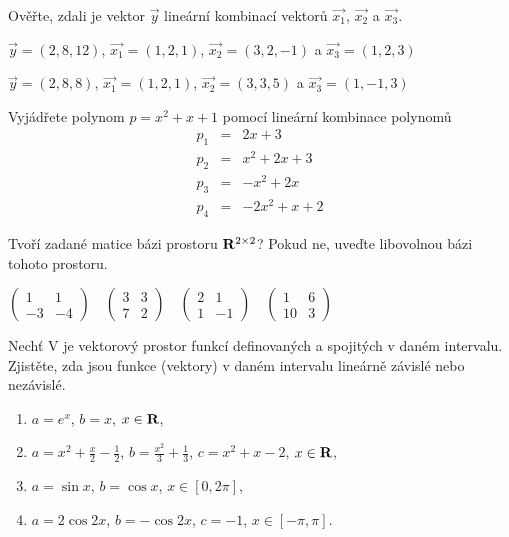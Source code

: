 \documentclass[a4paper,10pt]{book}
\def\Real{{\rm\bf R}}
\begin{document}
\exercise \label{ex:lkb2} Ověřte, zdali je vektor $\vec{y}$ lineární kombinací vektorů $\vec{x_1}$, $\vec{x_2}$ a $\vec{x_3}$.

  \begin{enumerate*} 
    \item $\vec{y}=(2,8,12)$, $\vec{x_1}=(1,2,1)$, $\vec{x_2}=(3,2,-1)$ a $\vec{x_3}=(1,2,3)$  \\
    \item $\vec{y}=(2,8,8)$, $\vec{x_1}=(1,2,1)$, $\vec{x_2}=(3,3,5)$ a $\vec{x_3}=(1,-1,3)$  \\
  \end{enumerate*}
  
\exercise \label{ex:lkb3} Vyjádřete polynom $p = x^2+x+1$ pomocí lineární kombinace polynomů
  \begin{eqnarray*}
    p_1 &=& 2x + 3 \\
    p_2 &=& x^2+2x+3 \\
    p_3 &=& -x^2+2x \\
    p_4 &=& -2x^2+x+2
  \end{eqnarray*}

\exercise \label{ex:lkb4} Tvoří zadané matice bázi prostoru $\Real^{2\times2}$? 
Pokud ne, uveďte libovolnou bázi tohoto prostoru.
\vspace{-1em}
\begin{center}
$ \begin{pmatrix}
        1 & 1 \\ -3 & -4
  \end{pmatrix} \quad
  \begin{pmatrix}
        3 & 3 \\ 7 & 2
  \end{pmatrix} \quad
  \begin{pmatrix}
        2 & 1 \\ 1 & -1
  \end{pmatrix} \quad
  \begin{pmatrix}
        1 & 6 \\ 10 & 3
  \end{pmatrix}
$ 
\end{center}

\exercise \label{ex:lkb5} Nechť V je vektorový prostor funkcí definovaných a spojitých v daném intervalu.
Zjistěte, zda jsou funkce (vektory) v daném intervalu lineárně závislé nebo nezávislé.
\begin{enumerate}[label=\alph*)]
\item $a = e^x$, $b = x$, $x \in \Real$,
\item $a = x^2 +\frac{x}{2}-\frac{1}{2}$, $b=\frac{x^2}{3}+\frac{1}{3}$, 
      $c=x^2+x-2$, $x \in \Real$,
\item $a = \sin x$, $b = \cos x$, $x \in [0, 2\pi]$,
\item $a = 2\cos 2x$, $b = -\cos2x$, $c = -1$, $x \in [-\pi, \pi]$.
\end{enumerate}
\end{document}
